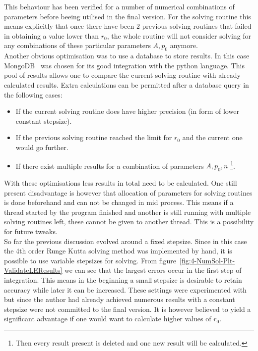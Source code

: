 This behaviour has been verified for a number of numerical combinations of parameters before beeing utilised in the final version.
For the solving routine this means explicitly that once there have been $2$ previous solving routines that failed in obtaining a value lower than $r_0$, the whole routine will not consider solving for any combinations of these particular parameters $A,p_0$ anymore.\\
Another obvious optimisation was to use a database to store results.
In this case MongoDB~\cite{dirolfPymongo11Python2021} was chosen for its good integration with the python language.
This pool of results allows one to compare the current solving routine with already calculated results.
Extra calculations can be permitted after a database query in the following cases:
\begin{itemize}
	\item If the current solving routine does have higher precision (in form of lower constant stepsize).
	\item If the previous solving routine reached the limit for $r_0$ and the current one would go further.
	\item If there exist multiple results for a combination of parameters $A,p_0,n$ \footnote{Then every result present is deleted and one new result will be calculated.}.
\end{itemize}
With these optimisations less results in total need to be calculated.
One still present disadvantage is however that allocation of parameters for solving routines is done beforehand and can not be changed in mid process.
This means if a thread started by the program finished and another is still running with multiple solving routines left, these cannot be given to another thread.
This is a possibility for future tweaks.\\
So far the previous discussion evolved around a fixed stepsize.
Since in this case the 4th order Runge Kutta solving method was implemented by hand, it is possible to use variable stepsizes for solving.
From figure~\ref{fig:4-NumSol-Plt-ValidateLEResults} we can see that the largest errors occur in the first step of integration.
This means in the beginning a small stepsize is desirable to retain accuracy while later it can be increased.
These settings were experimented with but since the author had already achieved numerous results with a constant stepsize were not committed to the final version.
It is however believed to yield a significant advantage if one would want to calculate higher values of $r_0$.\\
